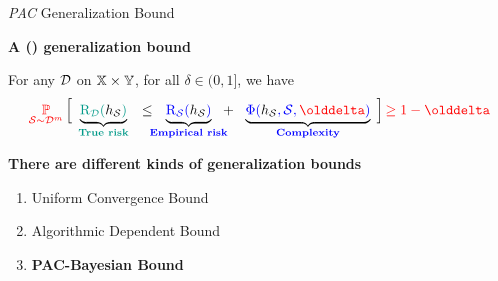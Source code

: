 \documentclass{slides}
\begin{document}
\begin{xframe}{{\it PAC} Generalization Bound}
  \begin{redbox}{}
  {\bf A    () generalization bound}~{\small\citep{Valiant1984}}

    {\small For any $\mathcal{D}$ on $\mathbb{X}\times\mathbb{Y}$, for all $\delta\in(0, 1]$, we have}\\[-0.6cm]
    \begin{align*}
      \red{\PP_{\dS\sim\D^\m}}\,\Big[\; \underbrace{\green{\Risk_{\D}(\black{\h_{\dS}})}}_{\green{\text{\bf True risk}}} \ \ \le\ \ \underbrace{\blue{\Risk_{\dS}(\black{\h_{\dS}})}}_{\mathclap{\text{\bf\blue{Empirical risk}}}} \ \ + \ \  \underbrace{\blue{\Phi(\black{\h_{\dS}}, \dS, \delta)}}_{\mathclap{\text{\blue{\bf Complexity}}}} \;\Big]\,\red{\ge 1-\delta}
    \end{align*}
  \end{redbox}

   \vfill
  
  {\bf There are different kinds of  generalization bounds \eg}\\[0.4cm]
  \begin{enumerate}
    \item Uniform Convergence Bound~\citep{VapnikChervonenkis1971, BartlettMendelson2002}
    \item Algorithmic Dependent Bound~\citep{BousquetElisseeff2002,XuMannor2012}
    \item {\bf PAC-Bayesian Bound~\citep{ShaweTaylorWilliamson1997,McAllester1998}}
  \end{enumerate}

\end{xframe}

\end{document}
